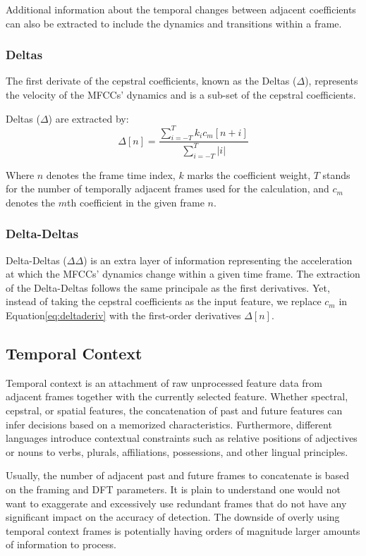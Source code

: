 Additional information about the temporal 
changes between adjacent coefficients can also be extracted
to include the dynamics and transitions within a frame.

\subsubsection{Deltas}
The first derivate of the cepstral coefficients, known as the Deltas (\(\Delta\)),
represents the velocity of the MFCCs' dynamics and 
is a sub-set of the cepstral coefficients.

Deltas (\(\Delta\)) are extracted by:
\begin{equation}\label{eq:deltaderiv}
    \Delta [n] = \frac{ \sum\limits_{i=-T}^{T} k_{i} c_{m}[n+i]}
    {\sum\limits_{i=-T}^{T} |i|}
\end{equation}

Where \(n\) denotes the frame time index, \(k\) marks the 
coefficient weight, \(T\) stands for the number of temporally
adjacent frames used for the calculation, and \(c_{m}\) denotes the
\(m\)th coefficient in the given frame \(n\).

\subsubsection{Delta-Deltas}
Delta-Deltas (\(\Delta\Delta\)) is an extra layer of information
representing the acceleration at which the 
MFCCs' dynamics change within a given time frame.
The extraction of the Delta-Deltas follows the same principale
as the first derivatives. Yet, instead of taking the
cepstral coefficients as the input feature, we replace
\(c_{m}\) in Equation\;\ref{eq:deltaderiv} 
with the first-order derivatives \(\Delta[n]\).

\subsection{Temporal Context}
Temporal context is an attachment of raw unprocessed 
feature data from adjacent
frames together with the currently selected feature. 
Whether spectral, cepstral, or spatial features,
the concatenation of past and future 
features can infer decisions based on a memorized characteristics.
Furthermore, different languages
introduce contextual constraints such as relative positions
of adjectives or nouns to verbs, plurals, affiliations,
possessions, and other lingual principles.

Usually, the number of adjacent past and future frames 
to concatenate is based on the framing and DFT parameters.
It is plain to understand 
one would not want to exaggerate and excessively use
redundant frames that do not have any significant impact
on the accuracy of detection. 
The downside of overly using temporal context frames is potentially having 
orders of magnitude larger amounts of information to process.

